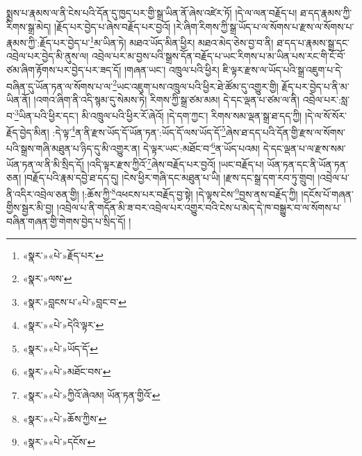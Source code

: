 སྨྲས་པ་རྣམས་ལ་ནི་ངེས་པའི་དོན་དུ་ཁྱད་པར་གྱི་སྒྲ་ཡིན་ནོ་ཞེས་འཛེར་ཏོ། །དེ་ལ་ལན་བརྗོད་པ། ཐ་དད་རྣམས་ཀྱི་རིགས་སྒྲ་མེད། །རྗོད་པར་བྱེད་པ་ཞེས་བརྗོད་པར་བྱའོ། །རེ་ཞིག་རིགས་ཀྱི་སྒྲ་ཡོད་པ་ལ་སོགས་པ་རྫས་ལ་སོགས་པ་རྣམས་ཀྱི་:རྗོད་པར་བྱེད་པ་\footnote{«སྣར་»«པེ་»རྗོད་པར་}མ་ཡིན་ཏེ། མཐའ་ཡོད་མིན་ཕྱིར། མཐའ་མེད་ཅེས་བྱ་བ་ནི། ཐ་དད་པ་རྣམས་སྒྲ་དང་འབྲེལ་པར་བྱེད་མི་ནུས་ལ། འབྲེལ་པར་མ་བྱས་པའི་སྒྲས་དོན་བརྗོད་པ་ཡང་རིགས་པ་མ་ཡིན་པས་རང་གི་ངོ་བོ་ཙམ་ཞིག་རྟོགས་པར་བྱེད་པར་ཟད་དོ། །གཞན་ཡང་། འཁྲུལ་པའི་ཕྱིར། ཇི་ལྟར་རྫས་ལ་ཡོད་པའི་སྒྲ་འཇུག་པ་དེ་བཞིན་དུ་ཡོན་ཏན་ལ་སོགས་པ་ལ་\footnote{«སྣར་»ལས་}ཡང་འཇུག་པས་འཁྲུལ་པའི་ཕྱིར་ཐེ་ཚོམ་དུ་འགྱུར་གྱི། རྗོད་པར་བྱེད་པ་ནི་མ་ཡིན་ནོ། །འགའ་ཞིག་ནི་འདི་སྙམ་དུ་སེམས་ཏེ། རིགས་ཀྱི་སྒྲ་ཙམ་མམ། དེ་དང་ལྡན་པ་ཙམ་ལ་ནི། འབྲེལ་པར་:སླ་བ་\footnote{«སྣར་»བླངས་པ་«པེ་»བླང་བ་}ཡིན་པའི་ཕྱིར་དང་། མི་འཁྲུལ་པའི་ཕྱིར་རོ་ཞེའོ། །དེ་དག་ཀྱང་། རིགས་སམ་ལྡན་སྒྲ་ཐ་དད་ཀྱི། །དེ་ལ་སོ་སོར་རྗོད་བྱེད་མིན། :དེ་ལྟ་\footnote{«སྣར་»«པེ་»དེའི་ལྟར་}ན་ནི་རྫས་ཡོད་དོ་ཡོན་ཏན་:ཡོད་དོ་ལས་ཡོད་དོ་\footnote{«སྣར་»«པེ་»ཡོད་དོ་}ཞེས་ཐ་དད་པའི་དོན་གྱི་རྫས་ལ་སོགས་པའི་སྒྲས་གཞི་མཐུན་པ་ཉིད་དུ་མི་འགྱུར་ན། དེ་ལྟར་ཡང་:མཐོང་བ་\footnote{«སྣར་»«པེ་»མཐོང་བས་}ན་ཡོད་པའམ། དེ་དང་ལྡན་པ་ལ་རྫས་སམ་ཡོན་ཏན་ལ་ནི་མི་སྲིད་དོ། །འདི་ལྟར་རྫས་ཀྱིའོ་\footnote{«སྣར་»«པེ་»ཀྱིའོ་ཞེའམ། ཡོན་ཏན་གྱིའོ་}ཞེས་བརྗོད་པར་བྱའོ། །ཡང་བརྗོད་པ། ཡོན་ཏན་དང་ནི་ཡོན་ཏན་ཅན། །བརྗོད་པའི་རྣམ་དབྱེ་ཐ་དད་དུ། །ངེས་ཕྱིར་གཞི་དང་མཐུན་པ་ཡི། །རྫས་དང་སྒྲ་དག་རབ་ཏུ་གྲུབ། །འབྲེལ་པ་ནི་འདིར་འབྲེལ་ཅན་གྱི། །:ཆོས་ཀྱི་\footnote{«སྣར་»«པེ་»ཆོས་ཀྱིས་}འཕངས་པར་བརྗོད་བྱ་སྟེ། །དེ་ལྟས་ངེས་\footnote{«སྣར་»«པེ་»དངོས་}བྱས་ནས་བརྗོད་ཀྱི། །དངོས་པོ་གཞན་གྱིས་སྦྱར་མི་བྱ། །འབྲེལ་པ་ནི་གདོན་མི་ཟ་བར་འབྲེལ་པར་འགྱུར་བའི་ངེས་པ་མེད་དེ་ཁ་བསྒྱུར་བ་ལ་སོགས་པ་བཞིན་གཞན་གྱི་གེགས་བྱེད་པ་སྲིད་དོ། །

